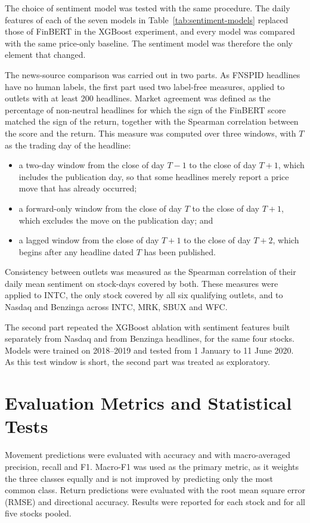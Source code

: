 The choice of sentiment model was tested with the same procedure. The daily features of each of the seven models in Table~\ref{tab:sentiment-models} replaced those of FinBERT in the XGBoost experiment, and every model was compared with the same price-only baseline. The sentiment model was therefore the only element that changed.

The news-source comparison was carried out in two parts. As FNSPID headlines have no human labels, the first part used two label-free measures, applied to outlets with at least 200 headlines. Market agreement was defined as the percentage of non-neutral headlines for which the sign of the FinBERT score matched the sign of the return, together with the Spearman correlation between the score and the return. This measure was computed over three windows, with $T$ as the trading day of the headline:
\begin{itemize}
\item a two-day window from the close of day $T-1$ to the close of day $T+1$, which includes the publication day, so that some headlines merely report a price move that has already occurred;
\item a forward-only window from the close of day $T$ to the close of day $T+1$, which excludes the move on the publication day; and
\item a lagged window from the close of day $T+1$ to the close of day $T+2$, which begins after any headline dated $T$ has been published.
\end{itemize}

Consistency between outlets was measured as the Spearman correlation of their daily mean sentiment on stock-days covered by both. These measures were applied to INTC, the only stock covered by all six qualifying outlets, and to Nasdaq and Benzinga across INTC, MRK, SBUX and WFC.

The second part repeated the XGBoost ablation with sentiment features built separately from Nasdaq and from Benzinga headlines, for the same four stocks. Models were trained on 2018--2019 and tested from 1 January to 11 June 2020. As this test window is short, the second part was treated as exploratory.

\section{Evaluation Metrics and Statistical Tests}
\label{sec:evaluation}
Movement predictions were evaluated with accuracy and with macro-averaged precision, recall and F1. Macro-F1 was used as the primary metric, as it weights the three classes equally and is not improved by predicting only the most common class. Return predictions were evaluated with the root mean square error (RMSE) and directional accuracy. Results were reported for each stock and for all five stocks pooled.

